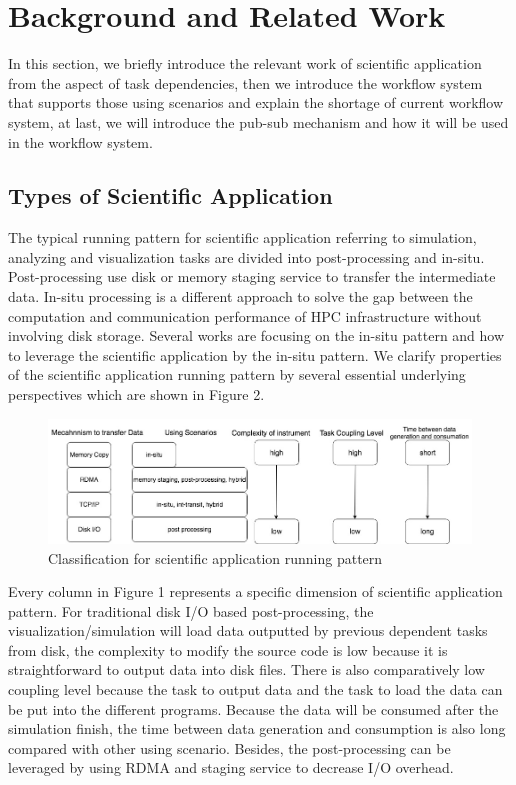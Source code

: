 \section{Background and Related Work}
In this section, we briefly introduce the relevant work of scientific application from the aspect of task dependencies, then we introduce the workflow system that supports those using scenarios and explain the shortage of current workflow system, at last, we will introduce the pub-sub mechanism and how it will be used in the workflow system.

\subsection{Types of Scientific Application}

The typical running pattern for scientific application referring to simulation, analyzing and visualization tasks are divided into post-processing and in-situ\cite{childs2012situ}. Post-processing use disk or memory staging service to transfer the intermediate data. In-situ processing is a different approach to solve the gap between the computation and communication performance of HPC infrastructure without involving disk storage\cite{childs2012situ}. Several works are focusing on the in-situ pattern and how to leverage the scientific application\cite{bauer2016situ,oldfield2014evaluation} by the in-situ pattern. We clarify properties of the scientific application running pattern by several essential underlying perspectives which are shown in Figure 2.

\begin{figure} 
\centering
\includegraphics[width=.95\linewidth]{./figure/application_classification.jpg}
\caption{Classification for scientific application running pattern}
 \label{fg:state}
\end{figure} 

Every column in Figure 1 represents a specific dimension of scientific application pattern. For traditional disk I/O based post-processing, the visualization/simulation will load data outputted by previous dependent tasks from disk, the complexity to modify the source code is low because it is straightforward to output data into disk files. There is also comparatively low coupling level \cite{beck2011congruence} because the task to output data and the task to load the data can be put into the different programs. Because the data will be consumed after the simulation finish, the time between data generation and consumption is also long compared with other using scenario. Besides, the post-processing can be leveraged by using RDMA and staging service to decrease I/O overhead.

